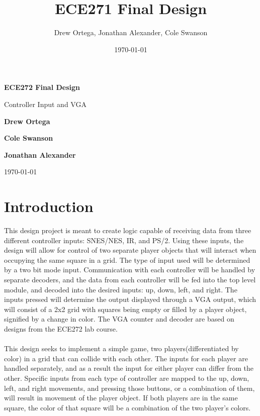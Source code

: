 \documentclass[]{article}
\title{ECE271 Final Design}
\author{Drew Ortega, Jonathan Alexander, Cole Swanson}
\date{\today}
\begin{document}
\begin{titlepage}
    \begin{center}
        \vspace*{1cm}
 
        \Huge
        \textbf{ECE272 Final Design}
 
        \vspace{0.5cm}
        \LARGE
        Controller Input and VGA
 
        \vspace{1.5cm}
 
        \textbf{Drew Ortega}
        
        \textbf{Cole Swanson}
        
        \textbf{Jonathan Alexander}
 
 		\vspace{0.5cm}
        \today
 
    \end{center}
\end{titlepage}

\newpage
	\tableofcontents
\newpage

\section{Introduction}
This design project is meant to create logic capable of receiving data from three different controller inputs: SNES/NES, IR, and PS/2.
Using these inputs, the design will allow for control of two separate player objects that will interact when occupying the same square in a grid.
The type of input used will be determined by a two bit mode input.
Communication with each controller will be handled by separate decoders, and the data from each controller will be fed into the top level module, and decoded into the desired inputs: up, down, left, and right.
The inputs pressed will determine the output displayed through a VGA output, which will consist of a 2x2 grid with squares being empty or filled by a player object, signified by a change in color.
The VGA counter and decoder are based on designs from the ECE272 lab course. \\~\\
This design seeks to implement a simple game, two players(differentiated by color) in a grid that can collide with each other.
The inputs for each player are handled separately, and as a result the input for either player can differ from the other.
Specific inputs from each type of controller are mapped to the up, down, left, and right movements, and pressing those buttons, or a combination of them, will result in movement of the player object.
If both players are in the same square, the color of that square will be a combination of the two player's colors. 
\end{document}

